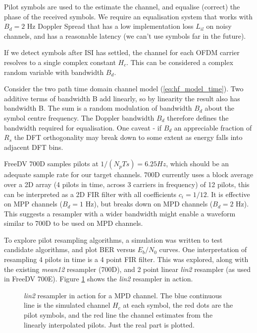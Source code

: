 \documentclass{article}
\begin{document}
Pilot symbols are used to the estimate the channel, and equalise (correct) the phase of the received symbols.  We require an equalisation system that works with $B_d=2$ Hz Doppler Spread that has a low implementation loss $L_{il}$ on noisy channels, and has a reasonable latency (we can't use symbols far in the future).

If we detect symbols after ISI has settled, the channel for each OFDM carrier resolves to a single complex constant $H_c$. This can be considered a complex random variable with bandwidth $B_d$. 

Consider the two path time domain channel model (\ref{eq:hf_model_time}). Two additive terms of bandwidth B add linearly, so by linearity the result also has bandwidth B.  The sum is a random modulation of bandwidth $B_d$ about the symbol centre frequency.  The Doppler bandwidth $B_d$ therefore defines the bandwidth required for equalisation. One caveat - if $B_d$ an appreciable fraction of $R_s$ the DFT orthogonality may break down to some extent as energy falls into adjacent DFT bins.

FreeDV 700D samples pilots at $1/(N_pTs)=6.25 \si{Hz}$, which should be an adequate sample rate for our target channels. 700D currently uses a block average over a 2D array (4 pilots in time, across 3 carriers in frequency) of 12 pilots, this can be interpreted as a 2D FIR filter with all coefficients $c_i=1/12$. It is effective on MPP channels ($B_d=1$ Hz), but breaks down on MPD channels ($B_d=2$ Hz).  This suggests a resampler with a wider bandwidth might enable a waveform similar to 700D to be used on MPD channels.

To explore pilot resampling algorithms, a simulation was written to test candidate algorithms, and plot BER versus $E_b/N_0$ curves.  One interpretation of resampling 4 pilots in time is a 4 point FIR filter. This was explored, along with the existing \emph{mean12} resampler (700D), and 2 point linear \emph{lin2} resampler (as used in FreeDV 700E). Figure \ref{fig:interpolator} shows the \emph{lin2} resampler in action.

\begin{figure}[h]
\caption{\emph{lin2} resampler in action for a MPD channel. The blue continuous line is the simulated channel $H_c$ at each symbol, the red dots are the pilot symbols, and the red line the channel estimates from the linearly interpolated pilots.  Just the real part is plotted.}
\label{fig:interpolator}
\begin{center}

\end{center}
\end{figure}
\end{document}
